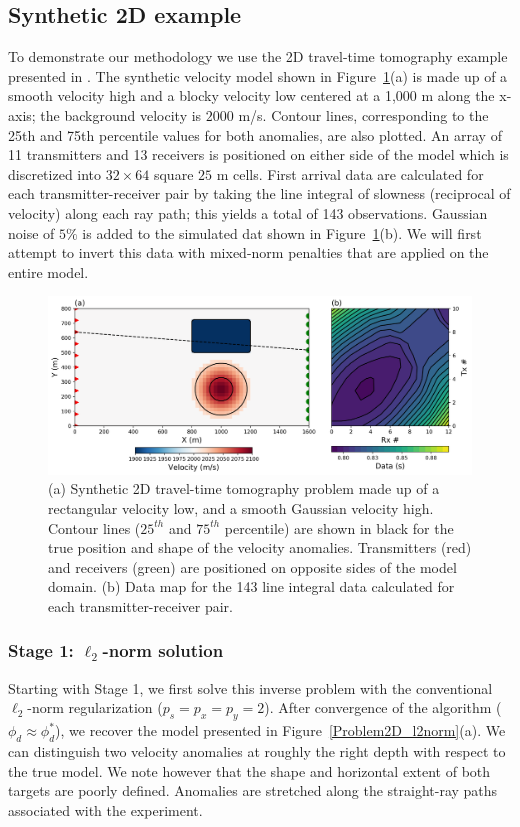 \documentclass[extra,referee]{gji}
\begin{document}
\subsection{Synthetic 2D example}
To demonstrate our methodology we use the 2D travel-time tomography example presented in \citet{SunLi14}. The synthetic velocity model shown in Figure~\ref{Problem2DTrue}(a) is made up of a smooth velocity high and a blocky velocity low centered at a 1,000 m along the x-axis; the background velocity is $2000$ m/s. Contour lines, corresponding to the 25th and 75th percentile values for both anomalies, are also plotted. An array of 11 transmitters and 13 receivers is positioned on either side of the model which is discretized into $32 \times 64$ square $25$ m cells.
First arrival data are calculated for each transmitter-receiver pair by taking the line integral of slowness (reciprocal of velocity) along each ray path; this yields a total of 143 observations. Gaussian noise of $5\%$ is added to the simulated dat shown in Figure~\ref{Problem2DTrue}(b).
We will first attempt to invert this data with mixed-norm penalties that are applied on the entire model.
\begin{figure}
\includegraphics[width=\columnwidth]{Figures/Problem2D_True.png}
\caption{(a) Synthetic 2D travel-time tomography problem made up of a rectangular velocity low, and a smooth Gaussian velocity high. Contour lines ($25^{th}$ and $75^{th}$ percentile) are shown in black for the true position and shape of the velocity anomalies. Transmitters (red) and receivers (green) are positioned on opposite sides of the model domain. (b) Data map for the 143 line integral data calculated for each transmitter-receiver pair.
}
\label{Problem2DTrue}
\end{figure}


\subsubsection{Stage 1: $\ell_2$-norm solution}
Starting with Stage 1, we first solve this inverse problem with the conventional $\ell_2$-norm regularization ($p_s=p_x=p_y=2$). After convergence of the algorithm ($\phi_d \approx \phi_d^*$), we recover the model presented in Figure~\ref{Problem2D_l2norm}(a).
We can distinguish two velocity anomalies at roughly the right depth with respect to the true model.
We note however that the shape and horizontal extent of both targets are poorly defined.
Anomalies are stretched along the straight-ray paths associated with the experiment.
\end{document}

